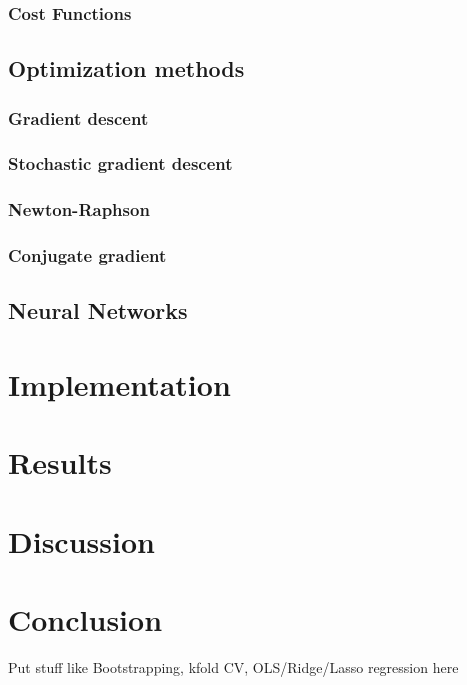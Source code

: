 \documentclass[11pt]{article}
\begin{document}
\subsubsection{Cost Functions}

\subsection{Optimization methods}
\subsubsection{Gradient descent}
\subsubsection{Stochastic gradient descent}
\subsubsection{Newton-Raphson}
\subsubsection{Conjugate gradient}


\subsection{Neural Networks}

\section{Implementation}

\section{Results}

\section{Discussion}

\section{Conclusion}

\begin{appendices}
Put stuff like Bootstrapping, kfold CV, OLS/Ridge/Lasso regression here
\end{appendices}



\end{document}
